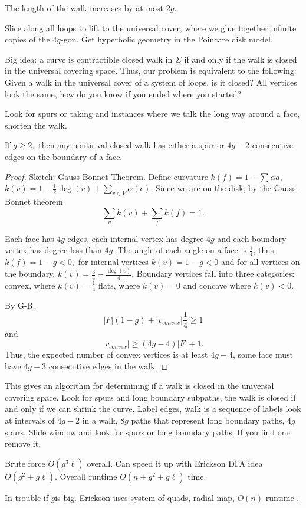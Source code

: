 The length of the walk increases by at most $2g$.

Slice along all loops to lift to the universal cover, where we glue
together infinite copies of the $4g$-gon. Get hyperbolic geometry
in the Poincare disk model. 

Big idea: a curve is contractible closed walk in $\Sigma$
if and only if the walk is closed in the universal covering space.
Thus, our problem is equivalent to the following: Given a walk
in the universal cover of a system of loops, is it closed?
All vertices look the same, how do you know if you ended where
you started?

Look for spurs or taking and instances where we talk the long way around a face, 
shorten the walk.
\begin{lemma}\label{lem:dehn}
If $g\geq 2,$ then any nontirival closed walk has either a spur
or $4g-2$ consecutive edges on the boundary of a face.
\end{lemma}
\begin{proof}
Sketch: Gauss-Bonnet Theorem.
Define curvature $k(f)=1-\sum \alpha{a}$,
$k(v)=1-\frac{1}{2}\deg(v)+\sum_{v\in V} \alpha(\epsilon)$.
Since we are on the disk, by the Gauss-Bonnet theorem
$$\sum_v k(v)+\sum_f k(f) =1.$$

Each face has $4g$ edges, each internal  vertex has degree $4g$
and each  boundary vertex  has degree less than $4g$.
The angle of each angle on a face  is $\frac{1}{4}$,
thus, $k(f)=1-g<0,$ for internal vertices  $k(v)=1-g<0$ and for all
vertices on the boundary, $k(v)=\frac{3}{4}-\frac{\deg(v)}{4}$.
Boundary vertices fall into three  categories: convex, where $k(v)=\frac{1}{4}$
flats,  where $k(v)=0$  and concave where $k(v)<0$.

By G-B, $$|F|(1-g)+|v_{convex}|\frac{1}{4}\geq 1$$
and 
$$|v_{convex}|\geq (4g-4)|F|+1.$$
Thus, the expected number of convex vertices is at least
$4g-4$, some face must have  $4g-3$ consecutive edges in the walk.
\end{proof}

This gives an algorithm for determining if a walk is closed in the universal
covering space.
Look for spurs and long boundary subpaths, the walk is closed if and  only if
we can  shrink the curve.
Label edges, walk is a sequence of labels
look at intervals of $4g-2$ in a walk, $8g$ paths
that represent long boundary paths, $4g$ spurs.
Slide window and look for spurs or long boundary paths.
If you find one remove it.

Brute force $O(g^3\ell)$ overall.
Can speed it up with Erickson DFA  idea
$O(g^2+g\ell)$.
Overall runtime $O(n+g^2+g\ell)$ time.

In trouble if $g$is big. Erickson uses system of quads,
radial map, $O(n)$ runtime  \cite{erickson-whittlesey-2013}.





